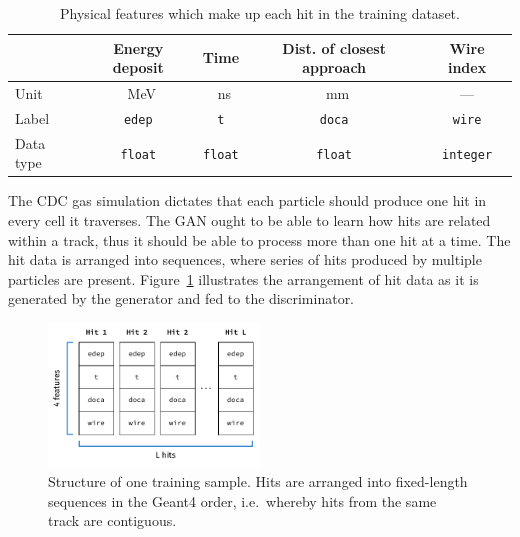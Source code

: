 \begin{table}
    \setlength{\tabcolsep}{12pt}
    \centering
    \begin{tabular}{l|cccc}
        \toprule
                  & \bfseries Energy deposit & \bfseries Time & \bfseries
                  Dist. of closest approach & \bfseries Wire index \\
        \midrule
        Unit      & \SI{}{\MeV}              & \SI{}{\ns}     & \SI{}{\mm}
        & ---                  \\
        Label     & \texttt{edep}            & \texttt{t}     & \texttt{doca}
        & \texttt{wire}        \\
        Data type & \texttt{float}           & \texttt{float} & \texttt{float}
        & \texttt{integer} \\\bottomrule
    \end{tabular}
    \caption{Physical features which make up each hit in the training dataset.}
    \label{tab:gan_features}
\end{table}

The CDC gas simulation dictates that each particle should produce one hit in
every cell it traverses. The GAN ought to be able to learn how hits are related
within a track, thus it should be able to process more than one hit at a time.
The hit data is arranged into sequences, where series of hits produced by
multiple particles are present. Figure~\ref{fig:hit_data_structure} illustrates
the arrangement of hit data as it is generated by the generator and fed to the
discriminator.

\begin{figure}
    \centering
    \includegraphics[width=0.5\textwidth]{chapter4/hit_sequence.drawio.pdf}
    \caption{Structure of one training sample. Hits are arranged into
    fixed-length sequences in the {\sc Geant4} order, i.e.\ whereby hits from
    the same track are contiguous.}
    \label{fig:hit_data_structure}
\end{figure}



